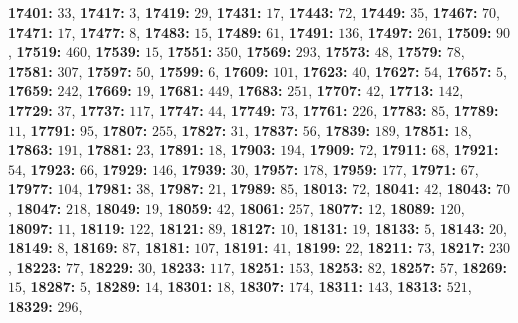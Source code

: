 \textsf{\bfseries 17401:} $33$, \textsf{\bfseries 17417:} $3$, \textsf{\bfseries 17419:} $29$, \textsf{\bfseries 17431:} $17$, \textsf{\bfseries 17443:} $72$, \textsf{\bfseries 17449:} $35$, \textsf{\bfseries 17467:} $70$, \textsf{\bfseries 17471:} $17$, \textsf{\bfseries 17477:} $8$, \textsf{\bfseries 17483:} $15$, \textsf{\bfseries 17489:} $61$, \textsf{\bfseries 17491:} $136$, \textsf{\bfseries 17497:} $261$, \textsf{\bfseries 17509:} $90$, \textsf{\bfseries 17519:} $460$, \textsf{\bfseries 17539:} $15$, \textsf{\bfseries 17551:} $350$, \textsf{\bfseries 17569:} $293$, \textsf{\bfseries 17573:} $48$, \textsf{\bfseries 17579:} $78$, \textsf{\bfseries 17581:} $307$, \textsf{\bfseries 17597:} $50$, \textsf{\bfseries 17599:} $6$, \textsf{\bfseries 17609:} $101$, \textsf{\bfseries 17623:} $40$, \textsf{\bfseries 17627:} $54$, \textsf{\bfseries 17657:} $5$, \textsf{\bfseries 17659:} $242$, \textsf{\bfseries 17669:} $19$, \textsf{\bfseries 17681:} $449$, \textsf{\bfseries 17683:} $251$, \textsf{\bfseries 17707:} $42$, \textsf{\bfseries 17713:} $142$, \textsf{\bfseries 17729:} $37$, \textsf{\bfseries 17737:} $117$, \textsf{\bfseries 17747:} $44$, \textsf{\bfseries 17749:} $73$, \textsf{\bfseries 17761:} $226$, \textsf{\bfseries 17783:} $85$, \textsf{\bfseries 17789:} $11$, \textsf{\bfseries 17791:} $95$, \textsf{\bfseries 17807:} $255$, \textsf{\bfseries 17827:} $31$, \textsf{\bfseries 17837:} $56$, \textsf{\bfseries 17839:} $189$, \textsf{\bfseries 17851:} $18$, \textsf{\bfseries 17863:} $191$, \textsf{\bfseries 17881:} $23$, \textsf{\bfseries 17891:} $18$, \textsf{\bfseries 17903:} $194$, \textsf{\bfseries 17909:} $72$, \textsf{\bfseries 17911:} $68$, \textsf{\bfseries 17921:} $54$, \textsf{\bfseries 17923:} $66$, \textsf{\bfseries 17929:} $146$, \textsf{\bfseries 17939:} $30$, \textsf{\bfseries 17957:} $178$, \textsf{\bfseries 17959:} $177$, \textsf{\bfseries 17971:} $67$, \textsf{\bfseries 17977:} $104$, \textsf{\bfseries 17981:} $38$, \textsf{\bfseries 17987:} $21$, \textsf{\bfseries 17989:} $85$, \textsf{\bfseries 18013:} $72$, \textsf{\bfseries 18041:} $42$, \textsf{\bfseries 18043:} $70$, \textsf{\bfseries 18047:} $218$, \textsf{\bfseries 18049:} $19$, \textsf{\bfseries 18059:} $42$, \textsf{\bfseries 18061:} $257$, \textsf{\bfseries 18077:} $12$, \textsf{\bfseries 18089:} $120$, \textsf{\bfseries 18097:} $11$, \textsf{\bfseries 18119:} $122$, \textsf{\bfseries 18121:} $89$, \textsf{\bfseries 18127:} $10$, \textsf{\bfseries 18131:} $19$, \textsf{\bfseries 18133:} $5$, \textsf{\bfseries 18143:} $20$, \textsf{\bfseries 18149:} $8$, \textsf{\bfseries 18169:} $87$, \textsf{\bfseries 18181:} $107$, \textsf{\bfseries 18191:} $41$, \textsf{\bfseries 18199:} $22$, \textsf{\bfseries 18211:} $73$, \textsf{\bfseries 18217:} $230$, \textsf{\bfseries 18223:} $77$, \textsf{\bfseries 18229:} $30$, \textsf{\bfseries 18233:} $117$, \textsf{\bfseries 18251:} $153$, \textsf{\bfseries 18253:} $82$, \textsf{\bfseries 18257:} $57$, \textsf{\bfseries 18269:} $15$, \textsf{\bfseries 18287:} $5$, \textsf{\bfseries 18289:} $14$, \textsf{\bfseries 18301:} $18$, \textsf{\bfseries 18307:} $174$, \textsf{\bfseries 18311:} $143$, \textsf{\bfseries 18313:} $521$, \textsf{\bfseries 18329:} $296$, 
